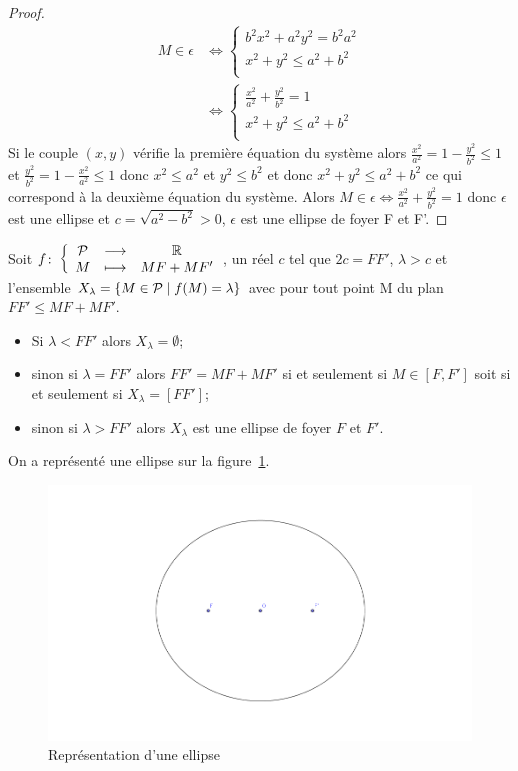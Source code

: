\begin{proof}
\begin{align}
  M \in \epsilon & \iff \begin{cases} b^2x^2 +a^2y^2=b^2a^2 \\ x^2+y^2 \leq a^2 +b^2\\\end{cases}\\
  & \iff \begin{cases} \frac{x^2}{a^2} +\frac{y^2}{b^2}=1\\ x^2+y^2 \leq a^2 +b^2 \\\end{cases}
\end{align}
Si le couple $(x,y)$ vérifie la première équation du système alors $\frac{x^2}{a^2}=1-\frac{y^2}{b^2}\leq 1$ et $\frac{y^2}{b^2}=1-\frac{x^2}{a^2} \leq 1$ donc $x^2 \leq a^2$ et $y^2 \leq b^2$ et donc $x^2+y^2 \leq a^2+b^2$ ce qui correspond à la deuxième équation du système.
Alors $M \in \epsilon \iff \frac{x^2}{a^2} +\frac{y^2}{b^2}=1$ donc $\epsilon$ est une ellipse et $c=\sqrt{a^2-b^2}>0$, $\epsilon$ est une ellipse de foyer F et F'.
\end{proof}
Soit $f\colon \left\{\begin{array}{ccc} \mathcal{P} & \longrightarrow &\mathbb{R}\\ M & \longmapsto & MF+MF' \end{array} \right.$, un réel $c$ tel que $2c=FF'$, $\lambda>c$ et l'ensemble $X_\lambda=\left\{M \in \mathcal{P}\mathrel{}\middle|\mathrel{}f(M)=\lambda\right\}$ avec pour tout point M du plan $FF'\leq MF+MF'$.
\begin{itemize}
\item Si $\lambda < FF'$ alors $X_\lambda=\emptyset$;
\item sinon si $\lambda=FF'$ alors $FF'=MF+MF'$ si et seulement si $M \in [F,F']$ soit si et seulement si $X_\lambda=[FF']$;
\item sinon si $\lambda >FF'$ alors $X_\lambda$ est une ellipse de foyer $F$ et $F'$.
\end{itemize}

On a représenté une ellipse sur la figure~\ref{fig:ellipse}.

\begin{figure}[!h]
  \centering
  \includegraphics[width=\textwidth]{./ellipse.png}
  \caption{Représentation d'une ellipse}
  \label{fig:ellipse}
\end{figure}


